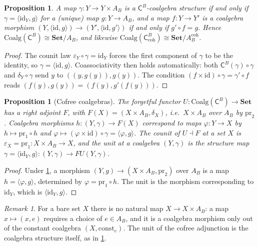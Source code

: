 \documentclass[11pt]{article}
\newtheorem{proposition}[theorem]{Proposition}
\theoremstyle{definition}
\theoremstyle{remark}
\newtheorem{remark}[theorem]{Remark}
\newcommand{\Set}{\mathbf{Set}}
\newcommand{\C}{\mathsf{C}}
\newcommand{\id}{\mathrm{id}}
\begin{document}
\begin{proposition}\label{prop:coalg}
A map $\gamma\colon Y\to Y\times A_B$ is a $\C^B$-coalgebra structure if and only if
$\gamma=\langle\id_Y,g\rangle$ for a (unique) map $g\colon Y\to A_B$, and a map $f\colon Y\to Y'$ is a
coalgebra morphism $(Y,\langle\id,g\rangle)\to(Y',\langle\id,g'\rangle)$ if and only if $g'\circ f=g$.
Hence $\mathrm{Coalg}(\C^B)\cong\Set/A_B$, and likewise $\mathrm{Coalg}(\C^B_{\mathrm{coh}})\cong
\Set/A^{\mathrm{coh}}_B$.
\end{proposition}
\begin{proof}
The counit law $\varepsilon_Y\circ\gamma=\id_Y$ forces the first component of $\gamma$ to be the
identity, so $\gamma=\langle\id,g\rangle$. Coassociativity then holds automatically: both
$\C^B(\gamma)\circ\gamma$ and $\delta_Y\circ\gamma$ send $y$ to $((y,g(y)),g(y))$. The condition
$(f\times\id)\circ\gamma=\gamma'\circ f$ reads $(f(y),g(y))=(f(y),g'(f(y)))$.
\end{proof}

\begin{proposition}[Cofree coalgebras]\label{prop:cofree}
The forgetful functor $U\colon\mathrm{Coalg}(\C^B)\to\Set$ has a right adjoint $F$, with
$F(X)=(X\times A_B,\delta_X)$, i.e.\ $X\times A_B$ over $A_B$ by $\mathrm{pr}_2$. Coalgebra morphisms
$h\colon(Y,\gamma)\to F(X)$ correspond to maps $\varphi\colon Y\to X$ by $h\mapsto\mathrm{pr}_1\circ h$
and $\varphi\mapsto(\varphi\times\id)\circ\gamma=\langle\varphi,g\rangle$. The counit of $U\dashv F$
at a set $X$ is $\varepsilon_X=\mathrm{pr}_1\colon X\times A_B\to X$, and the unit at a coalgebra
$(Y,\gamma)$ is the structure map $\gamma=\langle\id_Y,g\rangle\colon(Y,\gamma)\to FU(Y,\gamma)$.
\end{proposition}
\begin{proof}
Under \cref{prop:coalg}, a morphism $(Y,g)\to(X\times A_B,\mathrm{pr}_2)$ over $A_B$ is a map
$h=\langle\varphi,g\rangle$, determined by $\varphi=\mathrm{pr}_1\circ h$. The unit is the morphism
corresponding to $\id_Y$, which is $\langle\id_Y,g\rangle$.
\end{proof}

\begin{remark}
For a bare set $X$ there is no natural map $X\to X\times A_B$: a map $x\mapsto(x,e)$ requires a choice
of $e\in A_B$, and it is a coalgebra morphism only out of the constant coalgebra $(X,\mathrm{const}_e)$.
The unit of the cofree adjunction is the coalgebra structure itself, as in \cref{prop:cofree}.
\end{remark}
\end{document}

